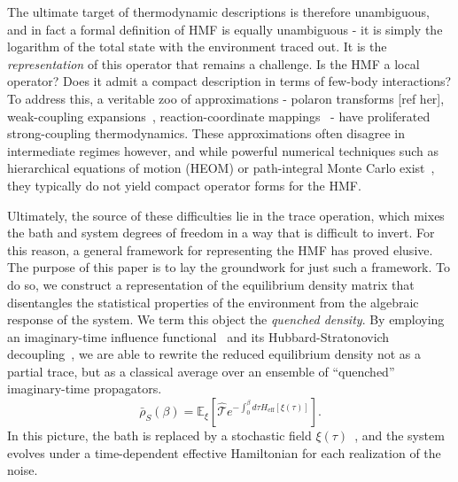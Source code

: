 The ultimate target of thermodynamic descriptions is therefore unambiguous, and in fact a formal definition of HMF is equally unambiguous - it is simply the logarithm of the total state with the environment traced out. It is the \emph{representation} of this operator that remains a challenge. Is the HMF a local operator? Does it admit a compact description in terms of few-body interactions? To address this, a veritable zoo of approximations - polaron transforms [ref her], weak-coupling expansions~\cite{cresserWeakUltrastrongCoupling2021a}, reaction-coordinate mappings~\cite{duGeneralizedHamiltonianMeanforce2025a,nazirReactionCoordinateMapping2018} - have proliferated strong-coupling thermodynamics. These approximations often disagree in intermediate regimes however, and while powerful numerical techniques such as hierarchical equations of motion (HEOM) or path-integral Monte Carlo exist~\cite{moixEquilibriumreducedDensityMatrix2012,chenRigorousStochasticMatrix2014,makriExploitingClassicalDecoherence2014,tanimuraReducedHierarchicalEquations2014,songCalculationCorrelatedInitial2015}, they typically do not yield compact operator forms for the HMF.

Ultimately, the source of these difficulties lie in the trace operation, which mixes the bath and system degrees of freedom in a way that is difficult to invert. For this reason, a general framework for representing the HMF has proved elusive. The purpose of this paper is to lay the groundwork for just such a framework. To do so, we construct a representation of the equilibrium density matrix that disentangles the statistical properties of the environment from the algebraic response of the system. We term this object the \emph{quenched density}. By employing an imaginary-time influence functional~\cite{feynmanTheoryGeneralQuantum1963a,caldeiraQuantumTunnellingDissipative1983a,grabertQuantumBrownianMotion1988} and its Hubbard-Stratonovich decoupling~\cite{hubbardCalculationPartitionFunctions1959a,stratonovich1957QDistro,stockburgerExactNumberRepresentation2002}, we are able to rewrite the reduced equilibrium density not as a partial trace, but as a classical average over an ensemble of ``quenched'' imaginary-time propagators.
\begin{equation}
    \bar{\rho}_S(\beta) = \mathbb{E}_{\xi}\left[ \hat{\mathcal{T}} e^{-\int_0^\beta d\tau H_{\mathrm{eff}}[\xi(\tau)]} \right].
\end{equation}
In this picture, the bath is replaced by a stochastic field $\xi(\tau)$~\cite{stockburgerSimulatingSpinbosonDynamics2004,mccaulPartitionfreeApproachOpen2017c,wiedmannNonMarkovianDynamicsQuantum2020}, and the system evolves under a time-dependent effective Hamiltonian for each realization of the noise.

